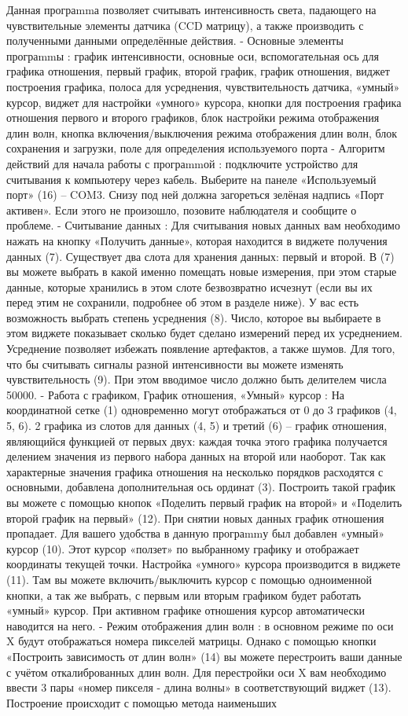 \documentclass[11pt,a4paper]{article}
\begin{document}
Данная програmmа позволяет считывать интенсивность света, падающего на чувствительные элементы датчика (CCD матрицу), а также производить с полученными данными определённые действия. - Основные элементы програmmы : график интенсивности, основные оси, вспомогательная ось для графика отношения, первый график, второй график, график отношения, виджет построения графика, полоса для усреднения, чувствительность датчика, «умный» курсор, виджет для настройки «умного» курсора, кнопки для построения графика отношения первого и второго графиков, блок настройки режима отображения длин волн, кнопка включения/выключения режима отображения длин волн, блок сохранения и загрузки, поле для определения используемого порта - Алгоритм действий для начала работы с програmmой : подключите устройство для считывания к компьютеру через кабель. Выберите на панеле «Используемый порт» (16) – COM3. Снизу под ней должна загореться зелёная надпись «Порт активен». Если этого не произошло, позовите наблюдателя и сообщите о проблеме. - Считывание данных : Для считывания новых данных вам необходимо нажать на кнопку «Получить данные», которая находится в виджете получения данных (7). Существует два слота для хранения данных: первый и второй. В (7) вы можете выбрать в какой именно помещать новые измерения, при этом старые данные, которые хранились в этом слоте безвозвратно исчезнут (если вы их перед этим не сохранили, подробнее об этом в разделе ниже). У вас есть возможность выбрать степень усреднения (8). Число, которое вы выбираете в этом виджете показывает сколько будет сделано измерений перед их усреднением. Усреднение позволяет избежать появление артефактов, а также шумов. Для того, что бы считывать сигналы разной интенсивности вы можете изменять чувствительность (9). При этом вводимое число должно быть делителем числа 50000. - Работа с графиком, График отношения, «Умный» курсор : На координатной сетке (1) одновременно могут отображаться от 0 до 3 графиков (4, 5, 6). 2 графика из слотов для данных (4, 5) и третий (6) – график отношения, являющийся функцией от первых двух: каждая точка этого графика получается делением значения из первого набора данных на второй или наоборот. Так как характерные значения графика отношения на несколько порядков расходятся с основными, добавлена дополнительная ось ординат (3). Построить такой график вы можете с помощью кнопок «Поделить первый график на второй» и «Поделить второй график на первый» (12). При снятии новых данных график отношения пропадает. Для вашего удобства в данную програmmу был добавлен «умный» курсор (10). Этот курсор «ползет» по выбранному графику и отображает координаты текущей точки. Настройка «умного» курсора производится в виджете (11). Там вы можете включить/выключить курсор с помощью одноименной кнопки, а так же выбрать, с первым или вторым графиком будет работать «умный» курсор. При активном графике отношения курсор автоматически наводится на него. - Режим отображения длин волн : в основном режиме по оси X будут отображаться номера пикселей матрицы. Однако с помощью кнопки «Построить зависимость от длин волн» (14) вы можете перестроить ваши данные с учётом откалиброванных длин волн. Для перестройки оси X вам необходимо ввести 3 пары «номер пикселя - длина волны» в соответствующий виджет (13). Построение происходит с помощью метода наименьших 
\end{document}
